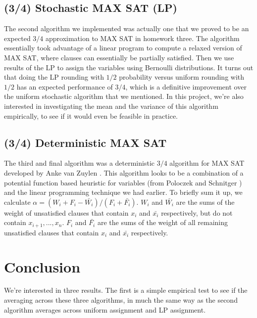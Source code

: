 \documentclass[paper=a4, fontsize=11pt]{scrartcl} %
\numberwithin{equation}{section} %
\numberwithin{figure}{section} %
\numberwithin{table}{section} %
\begin{document}
\subsection{(3/4) Stochastic MAX SAT (LP)}

The second algorithm we implemented was actually one that we proved to be an expected $3/4$ approximation to MAX SAT in homework three.  The algorithm essentially took advantage of a linear program to compute a relaxed version of MAX SAT, where clauses can essentially be partially satisfied.  Then we use results of the LP to assign the variables using Bernoulli distributions.  It turns out that doing the LP rounding with $1/2$ probability versus uniform rounding with $1/2$ has an expected performance of $3/4$, which is a definitive improvement over the uniform stochastic algorithm that we mentioned.  In this project, we're also interested in investigating the mean and the variance of this algorithm empirically, to see if it would even be feasible in practice.

\subsection{(3/4) Deterministic MAX SAT}

The third and final algorithm was a deterministic $3/4$ algorithm for MAX SAT developed by Anke van Zuylen \cite{Zuylen}.  This algorithm looks to be a combination of a potential function based heuristic for variables (from Poloczek and Schnitger \cite{PoloczekandSchnitger2011}) and the linear programming technique we had earlier.  To briefly sum it up, we calculate $\alpha = (W_i + F_i - \bar{W_i})/(F_i + \bar{F_i})$.  $W_i$ and $\bar{W_i}$ are the sums of the weight of unsatisfied clauses that contain $x_i$ and $\bar{x_i}$ respectively, but do not contain $x_{i+1},...,x_n$.  $F_i$ and $\bar{F_i}$ are the sums of the weight of all remaining unsatisfied clauses that contain $x_i$ and $\bar{x_i}$ respectively. 


\section{Conclusion}

We're interested in three results.  The first is a simple empirical test to see if the averaging across these three algorithms, in much the same way as the second algorithm averages across uniform assignment and LP assignment.
\end{document}
